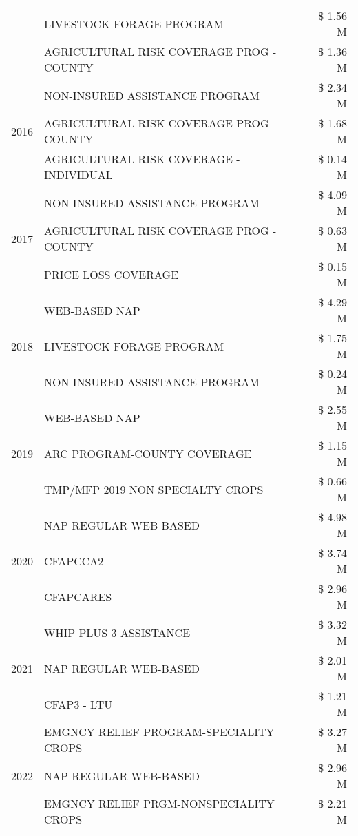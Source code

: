 \begin{tabular}{llr}
 & LIVESTOCK FORAGE PROGRAM & \$ 1.56 M \\
 & AGRICULTURAL RISK COVERAGE PROG - COUNTY & \$ 1.36 M \\
\cline{1-3}
\multirow[t]{3}{*}{2016} & NON-INSURED ASSISTANCE PROGRAM & \$ 2.34 M \\
 & AGRICULTURAL RISK COVERAGE PROG - COUNTY & \$ 1.68 M \\
 & AGRICULTURAL RISK COVERAGE - INDIVIDUAL & \$ 0.14 M \\
\cline{1-3}
\multirow[t]{3}{*}{2017} & NON-INSURED ASSISTANCE PROGRAM & \$ 4.09 M \\
 & AGRICULTURAL RISK COVERAGE PROG - COUNTY & \$ 0.63 M \\
 & PRICE LOSS COVERAGE & \$ 0.15 M \\
\cline{1-3}
\multirow[t]{3}{*}{2018} & WEB-BASED NAP & \$ 4.29 M \\
 & LIVESTOCK FORAGE PROGRAM & \$ 1.75 M \\
 & NON-INSURED ASSISTANCE PROGRAM & \$ 0.24 M \\
\cline{1-3}
\multirow[t]{3}{*}{2019} & WEB-BASED NAP & \$ 2.55 M \\
 & ARC PROGRAM-COUNTY COVERAGE & \$ 1.15 M \\
 & TMP/MFP 2019 NON SPECIALTY CROPS & \$ 0.66 M \\
\cline{1-3}
\multirow[t]{3}{*}{2020} & NAP REGULAR WEB-BASED & \$ 4.98 M \\
 & CFAPCCA2 & \$ 3.74 M \\
 & CFAPCARES & \$ 2.96 M \\
\cline{1-3}
\multirow[t]{3}{*}{2021} & WHIP PLUS 3 ASSISTANCE & \$ 3.32 M \\
 & NAP REGULAR WEB-BASED & \$ 2.01 M \\
 & CFAP3 - LTU & \$ 1.21 M \\
\cline{1-3}
\multirow[t]{3}{*}{2022} & EMGNCY RELIEF PROGRAM-SPECIALITY CROPS & \$ 3.27 M \\
 & NAP REGULAR WEB-BASED & \$ 2.96 M \\
 & EMGNCY RELIEF PRGM-NONSPECIALITY CROPS & \$ 2.21 M \\
\cline{1-3}
\bottomrule
\end{tabular}

